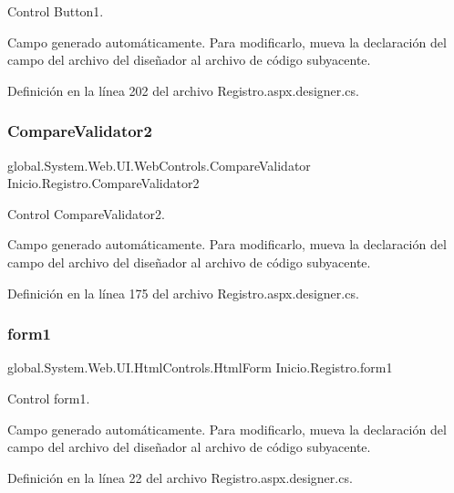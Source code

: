 Control Button1. 

Campo generado automáticamente. Para modificarlo, mueva la declaración del campo del archivo del diseñador al archivo de código subyacente. 

Definición en la línea 202 del archivo Registro.\+aspx.\+designer.\+cs.

\mbox{\label{classInicio_1_1Registro_abb680432cdd29ebb5f813036c644dadc}} 
\subsubsection{\texorpdfstring{CompareValidator2}{CompareValidator2}}
{\footnotesize\ttfamily global.\+System.\+Web.\+U\+I.\+Web\+Controls.\+Compare\+Validator Inicio.\+Registro.\+Compare\+Validator2\hspace{0.3cm}{\ttfamily [protected]}}



Control Compare\+Validator2. 

Campo generado automáticamente. Para modificarlo, mueva la declaración del campo del archivo del diseñador al archivo de código subyacente. 

Definición en la línea 175 del archivo Registro.\+aspx.\+designer.\+cs.

\mbox{\label{classInicio_1_1Registro_a0b8d260039acc63632a758544652ea24}} 
\subsubsection{\texorpdfstring{form1}{form1}}
{\footnotesize\ttfamily global.\+System.\+Web.\+U\+I.\+Html\+Controls.\+Html\+Form Inicio.\+Registro.\+form1\hspace{0.3cm}{\ttfamily [protected]}}



Control form1. 

Campo generado automáticamente. Para modificarlo, mueva la declaración del campo del archivo del diseñador al archivo de código subyacente. 

Definición en la línea 22 del archivo Registro.\+aspx.\+designer.\+cs.

